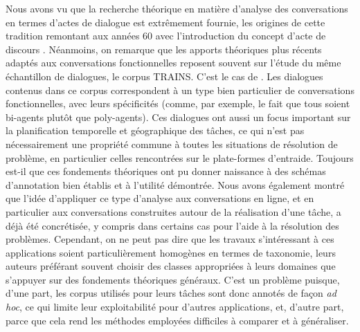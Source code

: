 \documentclass[10pt,a4paper,twoside]{article}
\begin{document}
Nous avons vu que la recherche théorique en matière d'analyse des conversations en termes d'actes de dialogue est extrêmement fournie, les origines de cette tradition remontant aux années 60 avec l'introduction du concept d'acte de discours \cite{austin1975how, searle1969speech}. Néanmoins, on remarque que les apports théoriques plus récents adaptés aux conversations fonctionnelles reposent souvent sur l'étude du même échantillon de dialogues, le corpus TRAINS. C'est le cas de \citet{traum1992conversation, poesio1998towards, core1997coding, bunt2009dit++}. Les dialogues contenus dans ce corpus correspondent à un type bien particulier de conversations fonctionnelles, avec leurs spécificités (comme, par exemple, le fait que tous soient bi-agents plutôt que poly-agents). Ces dialogues ont aussi un focus important sur la planification temporelle et géographique des tâches, ce qui n'est pas nécessairement une propriété commune à toutes les situations de résolution de problème, en particulier celles rencontrées sur le plate-formes d'entraide. Toujours est-il que ces fondements théoriques ont pu donner naissance à des schémas d'annotation bien établis et à l'utilité démontrée. Nous avons également montré que l'idée d'appliquer ce type d'analyse aux conversations en ligne, et en particulier aux conversations construites autour de la réalisation d'une tâche, a déjà été concrétisée, y compris dans certains cas pour l'aide à la résolution des problèmes. Cependant, on ne peut pas dire que les travaux s'intéressant à ces applications soient particulièrement homogènes en termes de taxonomie, leurs auteurs préférant souvent choisir des classes appropriées à leurs domaines que s'appuyer sur des fondements théoriques généraux. C'est un problème puisque, d'une part, les corpus utilisés pour leurs tâches sont donc annotés de façon \textit{ad hoc}, ce qui limite leur exploitabilité pour d'autres applications, et, d'autre part, parce que cela rend les méthodes employées difficiles à comparer et à généraliser.
\end{document}
